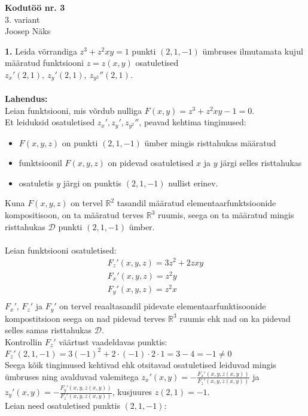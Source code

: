 \documentclass{article}
\begin{document}
\begin{center}
\Large\textbf{Kodutöö nr. 3}\\
3. variant\\
\small{Joosep Näks}
\end{center}
\textbf{1. }Leida võrrandiga $z^3+z^2xy=1$ punkti $(2,1,-1)$ ümbruses ilmutamata kujul määratud funktsiooni $z=z(x,y)$ osatuletised $z_x'(2,1),\ z_y'(2,1),\ z_{y^2}''(2,1)$.\\\\
\textbf{Lahendus:}\\
Leian funktsiooni, mis võrdub nulliga $F(x,y)=z^3+z^2xy-1=0$.\\
Et leiduksid osatuletised $z_x', z_y', z_{y^2}''$, peavad kehtima tingimused:
\begin {itemize}
\item$F(x,y,z)$ on punkti $(2,1,-1)$ ümber mingis risttahukas määratud
\item funktsioonil $F(x,y,z)$ on pidevad osatuletised $x$ ja $y$ järgi selles risttahukas
\item osatuletis $y$ järgi on punktis $(2,1,-1)$ nullist erinev.
\end{itemize}
Kuna $F(x,y,z)$ on tervel $\mathbb{R}^2$ tasandil määratud elementaarfunktsioonide kompositisoon, on ta määratud terves $\mathbb{R}^3$ ruumis, seega on ta määratud mingis risttahukas $\mathcal{D}$ punkti $(2,1,-1)$ ümber.\\\\
Leian funktsiooni osatuletised:
\begin{gather*}
F_z'(x,y,z)=3z^2+2zxy\\
F_x'(x,y,z)=z^2y\\
F_y'(x,y,z)=z^2x\\
\end{gather*}
$F_x'$, $F_z'$ ja $F_y'$ on tervel reaaltasandil pidevate elementaarfunktisoonide kompostitsioon seega on nad pidevad terves $\mathbb{R}^3$ ruumis ehk nad on ka pidevad selles samas risttahukas $\mathcal{D}$.\\
Kontrollin $F_z'$ väärtust vaadeldavas punktis:\\
$F_z'(2,1,-1)=3(-1)^2+2\cdot(-1)\cdot2\cdot1=3-4=-1\neq0$\\
Seega kõik tingimused kehtivad ehk otsitavad osatuletised leiduvad mingis ümbruses ning avalduvad valemitega $z_x'(x,y)=-\frac{F_x'(x,y,z(x,y))}{F_z'(x,y,z(x,y))}$ ja $z_y'(x,y)=-\frac{F_y'(x,y,z(x,y))}{F_z'(x,y,z(x,y))}$, kusjuures $z(2,1)=-1$.\\
Leian need osatuletised punktis $(2,1,-1)$:
\end{document}
